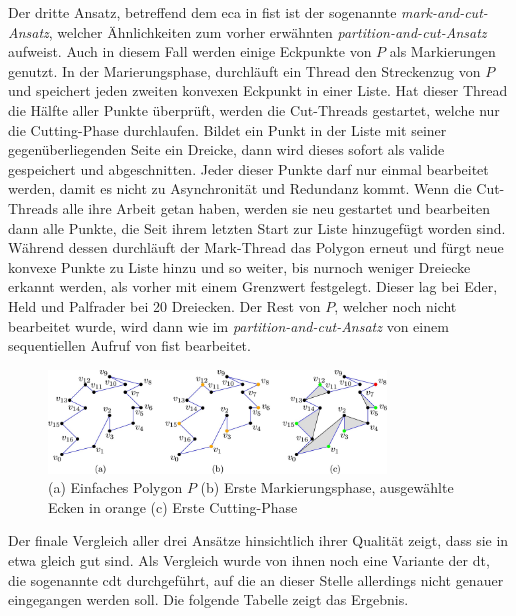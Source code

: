 Der dritte Ansatz, betreffend dem \ac{eca} in \ac{fist} ist der sogenannte \emph{mark-and-cut-Ansatz}, welcher Ähnlichkeiten zum vorher erwähnten \emph{partition-and-cut-Ansatz} aufweist. Auch in diesem Fall werden einige Eckpunkte von $P$ als Markierungen genutzt.
In der Marierungsphase, durchläuft ein Thread den Streckenzug von $P$ und speichert jeden zweiten konvexen Eckpunkt in einer Liste. Hat dieser Thread die Hälfte aller Punkte überprüft, werden die Cut-Threads gestartet, welche nur die Cutting-Phase durchlaufen. Bildet 
ein Punkt in der Liste mit seiner gegenüberliegenden Seite ein Dreicke, dann wird dieses sofort als valide gespeichert und abgeschnitten. Jeder dieser Punkte darf nur einmal bearbeitet werden, damit es nicht zu Asynchronität und Redundanz kommt. Wenn die Cut-Threads alle ihre Arbeit getan haben, 
werden sie neu gestartet und bearbeiten dann alle Punkte, die Seit ihrem letzten Start zur Liste hinzugefügt worden sind.
Während dessen durchläuft der Mark-Thread das Polygon erneut und fürgt neue konvexe Punkte zu Liste hinzu und so weiter, bis nurnoch weniger Dreiecke erkannt werden, als vorher mit einem Grenzwert festgelegt. Dieser lag bei Eder, Held und Palfrader bei 20 Dreiecken.
Der Rest von $P$, welcher noch nicht bearbeitet wurde, wird dann wie im \emph{partition-and-cut-Ansatz} von einem sequentiellen Aufruf von \ac{fist} bearbeitet. 

\begin{figure}[b]
    \centering
    \includegraphics[width=0.8\textwidth]{bilder/markierung.jpg}
    \caption[Markierung konvexer Eckpunkte für Parallelisierung]{\centering (a) Einfaches Polygon $P$ (b) Erste Markierungsphase, ausgewählte Ecken in orange (c) Erste Cutting-Phase}
    \label{fig:konvPoints}
\end{figure}

Der finale Vergleich aller drei Ansätze hinsichtlich ihrer Qualität zeigt, dass sie in etwa gleich gut sind. Als Vergleich wurde von ihnen noch eine Variante der \ac{dt}, die sogenannte \ac{cdt} durchgeführt, auf die an dieser Stelle allerdings nicht 
genauer eingegangen werden soll. Die folgende Tabelle zeigt das Ergebnis.

